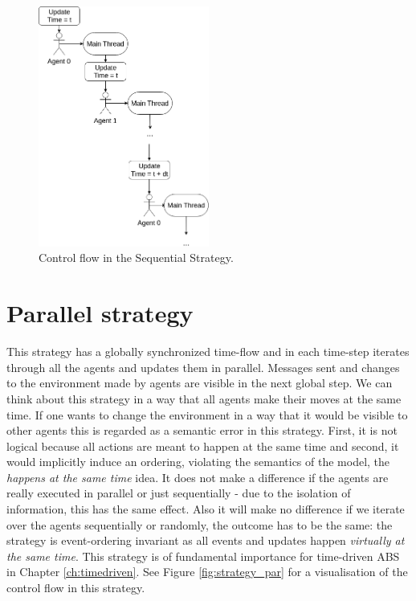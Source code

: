 \begin{figure}[H]
	\centering
	\includegraphics[width=0.5\textwidth, angle=0]{./fig/implabs/sequential.png}
	\caption{Control flow in the Sequential Strategy.}
	\label{fig:strategy_seq}
\end{figure}

\section{Parallel strategy}
\label{sub:par_strategy}
This strategy has a globally synchronized time-flow and in each time-step iterates through all the agents and updates them in parallel. Messages sent and changes to the environment made by agents are visible in the next global step. We can think about this strategy in a way that all agents make their moves at the same time.  If one wants to change the environment in a way that it would be visible to other agents this is regarded as a semantic error in this strategy. First, it is not logical because all actions are meant to happen at the same time and second, it would implicitly induce an ordering, violating the semantics of the model, the \textit{happens at the same time} idea.
It does not make a difference if the agents are really executed in parallel or just sequentially - due to the isolation of information, this has the same effect. Also it will make no difference if we iterate over the agents sequentially or randomly, the outcome has to be the same: the strategy is event-ordering invariant as all events and updates happen \textit{virtually at the same time}. This strategy is of fundamental importance for time-driven ABS in Chapter \ref{ch:timedriven}. See Figure \ref{fig:strategy_par} for a visualisation of the control flow in this strategy.

